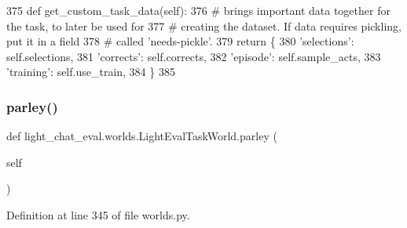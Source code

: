 \begin{DoxyCode}
375     \textcolor{keyword}{def }get\_custom\_task\_data(self):
376         \textcolor{comment}{# brings important data together for the task, to later be used for}
377         \textcolor{comment}{# creating the dataset. If data requires pickling, put it in a field}
378         \textcolor{comment}{# called 'needs-pickle'.}
379         \textcolor{keywordflow}{return} \{
380             \textcolor{stringliteral}{'selections'}: self.selections,
381             \textcolor{stringliteral}{'corrects'}: self.corrects,
382             \textcolor{stringliteral}{'episode'}: self.sample\_acts,
383             \textcolor{stringliteral}{'training'}: self.use\_train,
384         \}
385 \end{DoxyCode}
\mbox{\label{classlight__chat__eval_1_1worlds_1_1LightEvalTaskWorld_ae0eca37fa3376ebcd24115d1246dfd81}} 
\subsubsection{\texorpdfstring{parley()}{parley()}}
{\footnotesize\ttfamily def light\+\_\+chat\+\_\+eval.\+worlds.\+Light\+Eval\+Task\+World.\+parley (\begin{DoxyParamCaption}\item[{}]{self }\end{DoxyParamCaption})}



Definition at line 345 of file worlds.\+py.


